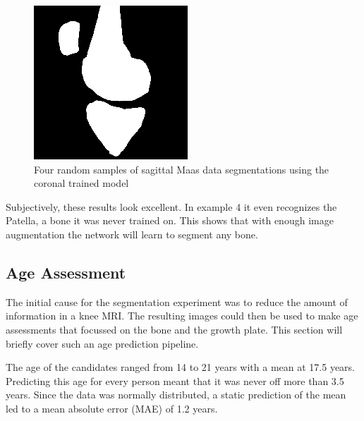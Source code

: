 \begin{figure}[H]
\endminipage\hfill
{}%
  \includegraphics[width=\linewidth]{imgs/transfer_pers_y4.png}
\endminipage
\caption{Four random samples of sagittal Maas data segmentations using the coronal trained model}
\end{figure}

Subjectively, these results look excellent. In example 4 it even recognizes the Patella, a bone it was never trained on. This shows that with enough image augmentation the network will learn to segment any bone.

\subsection{Age Assessment}

The initial cause for the segmentation experiment was to reduce the amount of information in a knee MRI. The resulting images could then be used to make age assessments that focussed on the bone and the growth plate. This section will briefly cover such an age prediction pipeline.

The age of the candidates ranged from 14 to 21 years with a mean at 17.5 years. Predicting this age for every person meant that it was never off more than 3.5 years. Since the data was normally distributed, a static prediction of the mean led to a mean absolute error (MAE) of 1.2 years.

